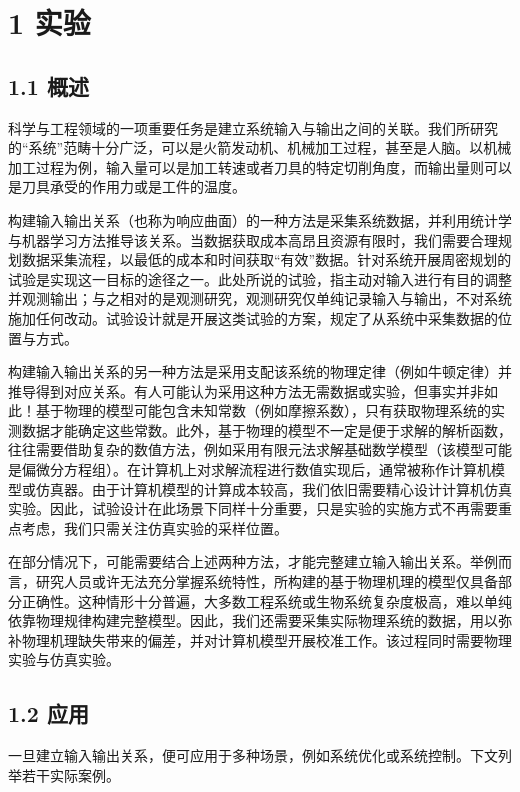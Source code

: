 \documentclass{ctexart}
\begin{document}
\section*{1 实验}

\subsection*{1.1 概述}

科学与工程领域的一项重要任务是建立系统输入与输出之间的关联。我们所研究的“系统”范畴十分广泛，可以是火箭发动机、机械加工过程，甚至是人脑。以机械加工过程为例，输入量可以是加工转速或者刀具的特定切削角度，而输出量则可以是刀具承受的作用力或是工件的温度。

构建输入输出关系（也称为响应曲面）的一种方法是采集系统数据，并利用统计学与机器学习方法推导该关系。当数据获取成本高昂且资源有限时，我们需要合理规划数据采集流程，以最低的成本和时间获取“有效”数据。针对系统开展周密规划的试验是实现这一目标的途径之一。此处所说的试验，指主动对输入进行有目的调整并观测输出；与之相对的是观测研究，观测研究仅单纯记录输入与输出，不对系统施加任何改动。试验设计就是开展这类试验的方案，规定了从系统中采集数据的位置与方式。

构建输入输出关系的另一种方法是采用支配该系统的物理定律（例如牛顿定律）并推导得到对应关系。有人可能认为采用这种方法无需数据或实验，但事实并非如此！基于物理的模型可能包含未知常数（例如摩擦系数），只有获取物理系统的实测数据才能确定这些常数。此外，基于物理的模型不一定是便于求解的解析函数，往往需要借助复杂的数值方法，例如采用有限元法求解基础数学模型（该模型可能是偏微分方程组）。在计算机上对求解流程进行数值实现后，通常被称作计算机模型或仿真器。由于计算机模型的计算成本较高，我们依旧需要精心设计计算机仿真实验。因此，试验设计在此场景下同样十分重要，只是实验的实施方式不再需要重点考虑，我们只需关注仿真实验的采样位置。

在部分情况下，可能需要结合上述两种方法，才能完整建立输入输出关系。举例而言，研究人员或许无法充分掌握系统特性，所构建的基于物理机理的模型仅具备部分正确性。这种情形十分普遍，大多数工程系统或生物系统复杂度极高，难以单纯依靠物理规律构建完整模型。因此，我们还需要采集实际物理系统的数据，用以弥补物理机理缺失带来的偏差，并对计算机模型开展校准工作。该过程同时需要物理实验与仿真实验。

\subsection*{1.2 应用}

一旦建立输入输出关系，便可应用于多种场景，例如系统优化或系统控制。下文列举若干实际案例。
\end{document}
